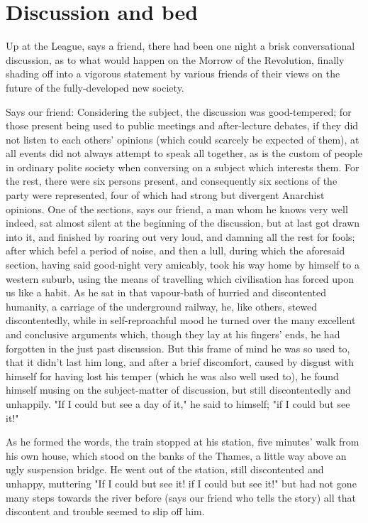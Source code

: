 \chapter{Discussion and bed}

Up at the League, says a friend, there had been one night a brisk
conversational discussion, as to what would happen on the Morrow of the
Revolution, finally shading off into a vigorous statement by various
friends of their views on the future of the fully-developed new society.

Says our friend: Considering the subject, the discussion was
good-tempered; for those present being used to public meetings and
after-lecture debates, if they did not listen to each others' opinions
(which could scarcely be expected of them), at all events did not always
attempt to speak all together, as is the custom of people in ordinary
polite society when conversing on a subject which interests them. For
the rest, there were six persons present, and consequently six sections
of the party were represented, four of which had strong but divergent
Anarchist opinions. One of the sections, says our friend, a man whom he
knows very well indeed, sat almost silent at the beginning of the
discussion, but at last got drawn into it, and finished by roaring out
very loud, and damning all the rest for fools; after which befel a
period of noise, and then a lull, during which the aforesaid section,
having said good-night very amicably, took his way home by himself to a
western suburb, using the means of travelling which civilisation has
forced upon us like a habit. As he sat in that vapour-bath of hurried
and discontented humanity, a carriage of the underground railway, he,
like others, stewed discontentedly, while in self-reproachful mood he
turned over the many excellent and conclusive arguments which, though
they lay at his fingers' ends, he had forgotten in the just past
discussion. But this frame of mind he was so used to, that it didn't
last him long, and after a brief discomfort, caused by disgust with
himself for having lost his temper (which he was also well used to), he
found himself musing on the subject-matter of discussion, but still
discontentedly and unhappily. "If I could but see a day of it," he said
to himself; "if I could but see it!"

As he formed the words, the train stopped at his station, five minutes'
walk from his own house, which stood on the banks of the Thames, a
little way above an ugly suspension bridge. He went out of the station,
still discontented and unhappy, muttering "If I could but see it! if I
could but see it!" but had not gone many steps towards the river before
(says our friend who tells the story) all that discontent and trouble
seemed to slip off him.

